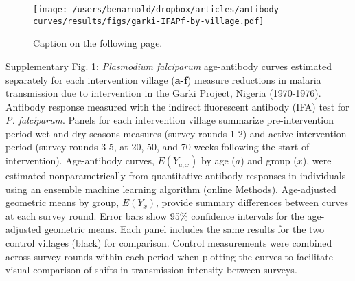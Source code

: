 \documentclass[11pt]{article}
\begin{document}
\clearpage
\begin{figure}[htbp]
\begin{center}
\texttt{[image: /users/benarnold/dropbox/articles/antibody-curves/results/figs/garki-IFAPf-by-village.pdf]}
\begin{minipage}{\textwidth}
\caption{Caption on the following page.}
\label{fig:garkiVillageEy}
\end{minipage}
\end{center}
\end{figure}
\clearpage
Supplementary Fig. 1: \textit{Plasmodium falciparum} age-antibody curves estimated separately for each intervention village (\textbf{a-f}) measure reductions in malaria transmission due to intervention in the Garki Project, Nigeria (1970-1976).  Antibody response measured with the indirect fluorescent antibody (IFA) test for \textit{P. falciparum}. Panels for each intervention village summarize pre-intervention period wet and dry seasons measures (survey rounds 1-2) and active intervention period (survey rounds 3-5, at 20, 50, and 70 weeks following the start of intervention).  Age-antibody curves, $E(Y_{a,x})$ by age ($a$) and group ($x$), were estimated nonparametrically from quantitative antibody responses in individuals using an ensemble machine learning algorithm (online Methods). Age-adjusted geometric means by group, $E(Y_x)$, provide summary differences between curves at each survey round. Error bars show 95\% confidence intervals for the age-adjusted geometric means. Each panel includes the same results for the two control villages (black) for comparison.  Control measurements were combined across survey rounds within each period when plotting the curves to facilitate visual comparison of shifts in transmission intensity between surveys. 
\end{document}
